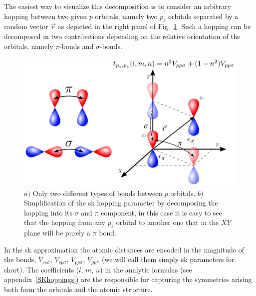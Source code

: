 The easiest way to visualize this decomposition is to consider an arbitrary hopping between two given $p$ orbitals, namely two $p_z$ orbitals separated by a random vector $\vec{r}$ as depicted in the right panel of Fig.~\ref{bonds}.
Such a hopping can be decomposed in two contributions depending on the relative orientation of the orbitals, namely $\pi$-bonds and $\sigma$-bonds.
\begin{figure}[h!]
\centering
\includegraphics{chapter04/figures/bonds.png}
\vspace{-5pt}
\caption{$a)$ Only two different types of bonds between $p$ orbitals. $b)$ Simplification of the \ac{sk} hopping parameter by decomposing the hopping into its $\sigma$ and $\pi$ component, in this case it is easy to see that the hopping from any $p_{z}$ orbital to another one that in the $XY$ plane will be purely a $\pi$ bond.}
\label{bonds}
\end{figure}
\FloatBarrier


In the \ac{sk} approximation the atomic distances are encoded in the magnitude of the bonds, $V_{ss\sigma}$, $V_{sp\sigma}$, $V_{pp\sigma}$, $V_{pp\pi}$ (we will call them simply \ac{sk} parameters for short). The coefficients ($l$, $m$, $n$) in the analytic formulas (see appendix~\ref{SKhoppings}) are the responsible for capturing the symmetries arising both form the orbitals and the atomic structure.\\

